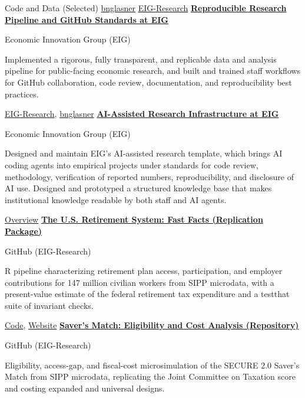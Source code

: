 \begin{rubric}{Code and Data (Selected)}
\entry*[Profiles]%
    \href{https://github.com/bnglasner}{bnglasner} \textbar{} \href{https://github.com/EIG-Research}{EIG-Research}
\entry*[2026]%
    \textbf{\href{https://github.com/EIG-Research}{Reproducible Research Pipeline and GitHub Standards at EIG}}
    \par Economic Innovation Group (EIG)
    \par Implemented a rigorous, fully transparent, and replicable data and analysis pipeline for public-facing economic research, and built and trained staff workflows for GitHub collaboration, code review, documentation, and reproducibility best practices.
    \par \href{https://github.com/EIG-Research}{EIG-Research}, \href{https://github.com/bnglasner}{bnglasner}
\entry*[2026]%
    \textbf{\href{https://bnglasner.github.io/ai-research/}{AI-Assisted Research Infrastructure at EIG}}
    \par Economic Innovation Group (EIG)
    \par Designed and maintain EIG's AI-assisted research template, which brings AI coding agents into empirical projects under standards for code review, methodology, verification of reported numbers, reproducibility, and disclosure of AI use. Designed and prototyped a structured knowledge base that makes institutional knowledge readable by both staff and AI agents.
    \par \href{https://bnglasner.github.io/ai-research/}{Overview}
\entry*[2026]%
    \textbf{\href{https://github.com/EIG-Research/EIG-Retirement-Fast-Facts-replication}{The U.S. Retirement System: Fast Facts (Replication Package)}}
    \par GitHub (EIG-Research)
    \par R pipeline characterizing retirement plan access, participation, and employer contributions for 147 million civilian workers from SIPP microdata, with a present-value estimate of the federal retirement tax expenditure and a testthat suite of invariant checks.
    \par \href{https://github.com/EIG-Research/EIG-Retirement-Fast-Facts-replication}{Code}, \href{https://eig.org/retirement-fast-facts/}{Website}
\entry*[2026]%
    \textbf{\href{https://github.com/EIG-Research/EIG-Savers-match-sipp}{Saver's Match: Eligibility and Cost Analysis (Repository)}}
    \par GitHub (EIG-Research)
    \par Eligibility, access-gap, and fiscal-cost microsimulation of the SECURE 2.0 Saver's Match from SIPP microdata, replicating the Joint Committee on Taxation score and costing expanded and universal designs.

\end{rubric}
